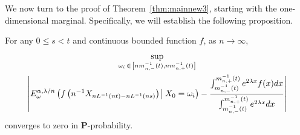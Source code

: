 \documentclass[10pt]{amsart}
\theoremstyle{definition}\newtheorem{defi}[theo]{Definition}\newtheorem{rema}[theo]{Remark}\newtheorem{exam}[theo]{Example}\newtheorem{exem}[theo]{Example}\newtheorem{nota}[theo]{Notation}
\newcommand{\bfP}{\mathbf{P}}
\begin{document}
We now turn to the proof of Theorem~\ref{thm:mainnew3}, starting with the one-dimensional marginal. Specifically, we will establish the following proposition.

\begin{prop}\label{onedm}
For any $0\leq s<t$ and continuous bounded function $f$, as $n\rightarrow\infty$,
\begin{multline*}
\sup_{\omega_i\,\in\,\left[nm_{n,-}^{-1}(t),nm_{n,+}^{-1}(t)\right]}\\
\left|{E}^{\alpha,\lambda/n}_\omega\left(f\left(n^{-1}{X}_{nL^{-1}(nt)-nL^{-1}(ns)}\right)\:\vline\:X_0=\omega_i\right)-\frac{\int_{m_{n,-}^{-1}(t)}^{m_{n,+}^{-1}(t)}e^{2\lambda x}f(x)dx}{\int_{m_{n,-}^{-1}(t)}^{m_{n,+}^{-1}(t)}e^{2\lambda x}dx}\right|
\end{multline*}
converges to zero in $\bfP$-probability.
\end{prop}
\end{document}
